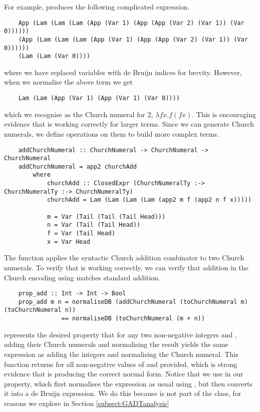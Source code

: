For example,  produces the following complicated expression.

\begin{lstlisting}
    App (Lam (Lam (Lam (App (Var 1) (App (App (Var 2) (Var 1)) (Var 0)))))) 
    (App (Lam (Lam (Lam (App (Var 1) (App (App (Var 2) (Var 1)) (Var 0)))))) 
    (Lam (Lam (Var 0))))
\end{lstlisting}

where we have replaced  variables with de Bruijn indices for brevity. However, when we normalise the above term we get

\begin{lstlisting}
    Lam (Lam (App (Var 1) (App (Var 1) (Var 0))))
\end{lstlisting}

which we recognise as the Church numeral for 2, $\lambda f x . f (f x)$. This is encouraging evidence that  is working correctly for larger terms. Since we can generate Church numerals, we define operations on them to build more complex terms.

\begin{lstlisting}
    addChurchNumeral :: ChurchNumeral -> ChurchNumeral -> ChurchNumeral
    addChurchNumeral = app2 churchAdd
        where 
            churchAdd :: ClosedExpr (ChurchNumeralTy :-> ChurchNumeralTy :-> ChurchNumeralTy)
            churchAdd = Lam (Lam (Lam (Lam (app2 m f (app2 n f x)))))

            m = Var (Tail (Tail (Tail Head)))
            n = Var (Tail (Tail Head))
            f = Var (Tail Head)
            x = Var Head 
\end{lstlisting}

The  function applies the syntactic Church addition combinator  to two Church numerals. To verify that  is working correctly, we can verify that addition in the Church encoding using  matches standard addition. 

\begin{lstlisting}
    prop_add :: Int -> Int -> Bool
    prop_add m n = normaliseDB (addChurchNumeral (toChurchNumeral m) (toChurchNumeral n)) 
                == normaliseDB (toChurchNumeral (m + n))
\end{lstlisting}

 represents the desired property that for any two non-negative integers  and , adding their Church numerals and normalising the result yields the same expression as adding the integers and normalising the Church numeral. This function returns  for all non-negative values of  and  provided, which is strong evidence that  is producing the correct normal form. Notice that we use  in our property, which first normalises the expression as usual using , but then converts it into a de Bruijn expression. We do this because  is not part of the  class, for reasons we explore in Section \ref{subsect:GADTanalysis}

